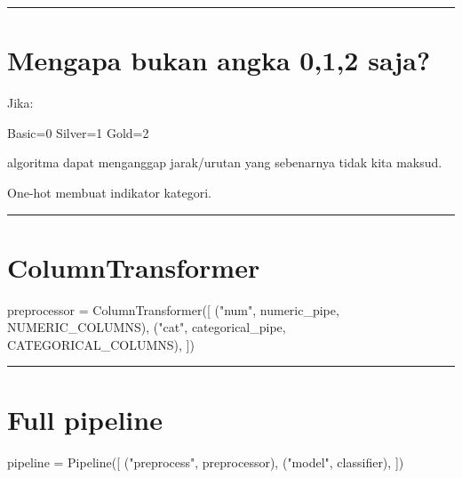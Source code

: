 \documentclass[
  indonesian,
  letterpaper,
  DIV=11,
  numbers=noendperiod]{scrreprt}
\newenvironment{Shaded}{\begin{snugshade}}{\end{snugshade}}
\newcommand{\NormalTok}[1]{\textcolor[rgb]{0.00,0.23,0.31}{#1}}
\newcommand{\OperatorTok}[1]{\textcolor[rgb]{0.37,0.37,0.37}{#1}}
\newcommand{\StringTok}[1]{\textcolor[rgb]{0.13,0.47,0.30}{#1}}
\begin{document}
\begin{center}\rule{0.5\linewidth}{0.5pt}\end{center}

\section{Mengapa bukan angka 0,1,2
saja?}\label{mengapa-bukan-angka-012-saja}

Jika:

\begin{Shaded}
\begin{Highlighting}[]
\NormalTok{Basic=0}
\NormalTok{Silver=1}
\NormalTok{Gold=2}
\end{Highlighting}
\end{Shaded}

algoritma dapat menganggap jarak/urutan yang sebenarnya tidak kita
maksud.

One-hot membuat indikator kategori.

\begin{center}\rule{0.5\linewidth}{0.5pt}\end{center}

\section{ColumnTransformer}\label{columntransformer}

\begin{Shaded}
\begin{Highlighting}[]
\NormalTok{preprocessor }\OperatorTok{=}\NormalTok{ ColumnTransformer([}
\NormalTok{    (}\StringTok{"num"}\NormalTok{, numeric\_pipe, NUMERIC\_COLUMNS),}
\NormalTok{    (}\StringTok{"cat"}\NormalTok{, categorical\_pipe, CATEGORICAL\_COLUMNS),}
\NormalTok{])}
\end{Highlighting}
\end{Shaded}

\begin{center}\rule{0.5\linewidth}{0.5pt}\end{center}

\section{Full pipeline}\label{full-pipeline}

\begin{Shaded}
\begin{Highlighting}[]
\NormalTok{pipeline }\OperatorTok{=}\NormalTok{ Pipeline([}
\NormalTok{    (}\StringTok{"preprocess"}\NormalTok{, preprocessor),}
\NormalTok{    (}\StringTok{"model"}\NormalTok{, classifier),}
\NormalTok{])}
\end{Highlighting}
\end{Shaded}
\end{document}
